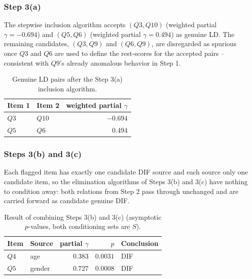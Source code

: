 \documentclass[12pt]{article}
\theoremstyle{examplestyle}
\begin{document}
\subsubsection{Step 3(a)}
The stepwise inclusion algorithm accepts $(Q3,Q10)$ (weighted partial $\gamma=-0.694$) and $(Q5,Q6)$ (weighted partial $\gamma=0.494$) as genuine LD. The remaining candidates, $(Q3,Q9)$ and $(Q6,Q9)$, are disregarded as spurious once $Q3$ and $Q6$ are used to define the rest-scores for the accepted pairs -- consistent with $Q9$'s already anomalous behavior in Step 1.
\begin{table}[H]
\centering
\begin{tabular}{@{}llr@{}}
\toprule
Item 1 & Item 2 & weighted partial $\gamma$ \\
\midrule
$Q3$ & $Q10$ & $-0.694$ \\
$Q5$ & $Q6$  & $0.494$ \\
\bottomrule
\end{tabular}
\caption{Genuine LD pairs after the Step 3(a) inclusion algorithm.}
\label{tab:ak_step3a}
\end{table}

\subsubsection{Steps 3(b) and 3(c)}
Each flagged item has exactly one candidate DIF source and each source only one candidate item, so the elimination algorithms of Steps 3(b) and 3(c) have nothing to condition away: both relations from Step 2 pass through unchanged and are carried forward as candidate genuine DIF.
\begin{table}[H]
\centering
\begin{tabular}{@{}llrrl@{}}
\toprule
Item & Source & partial $\gamma$ & $p$ & Conclusion \\
\midrule
$Q4$ & age & $0.383$ & $0.0031$ & DIF \\
$Q5$ & gender & $0.727$ & $0.0008$ & DIF \\
\bottomrule
\end{tabular}
\caption{Result of combining Steps 3(b) and 3(c) (asymptotic $p$-values, both conditioning sets are $S$).}
\label{tab:ak_step3bc}
\end{table}
\end{document}
